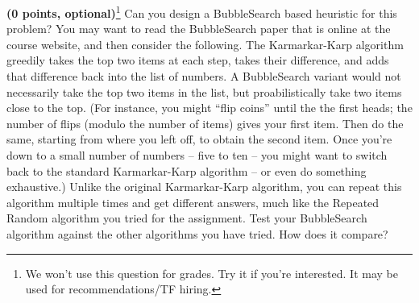 \documentclass[11pt]{article}
\begin{document}
{\bf (0 points, optional)}\footnote{We won't use this question for grades. Try it if you're interested. 
It may be used for recommendations/TF hiring.}
Can you design a BubbleSearch
based heuristic for this problem?  You may want to read the
BubbleSearch paper that is online at the course website, and then
consider the following. The Karmarkar-Karp algorithm greedily takes
the top two items at each step, takes their difference, and adds that
difference back into the list of numbers.  A BubbleSearch variant
would not necessarily take the top two items in the list, but
proabilistically take two items close to the top.  (For instance, you
might ``flip coins'' until the the first heads; the number of flips
(modulo the number of items) gives your first item.  Then do the same,
starting from where you left off, to obtain the second item.  Once
you're down to a small number of numbers -- five to ten -- you might
want to switch back to the standard Karmarkar-Karp algorithm -- or
even do something exhaustive.)  Unlike the original Karmarkar-Karp
algorithm, you can repeat this algorithm multiple times and get
different answers, much like the Repeated Random algorithm you tried
for the assignment.  Test your BubbleSearch algorithm against the
other algorithms you have tried.  How does it compare?
\end{document}
